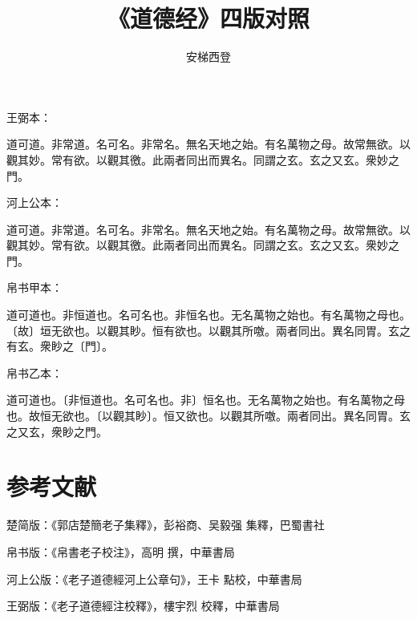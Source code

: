 \documentclass[a5paper]{ctexbook}
\title{《道德经》四版对照}
\author{安梯西登}
\date{}
\begin{document}
    \maketitle

    \tableofcontents

    \chapter{}
    王弼本：

    道可道。非常道。名可名。非常名。無名天地之始。有名萬物之母。故常無欲。以觀其妙。常有欲。以觀其徼。此兩者同出而異名。同謂之玄。玄之又玄。衆妙之門。

    河上公本：

    道可道。非常道。名可名。非常名。無名天地之始。有名萬物之母。故常無欲。以觀其妙。常有欲。以觀其徼。此兩者同出而異名。同謂之玄。玄之又玄。衆妙之門。

    帛书甲本：

    道可道也。非恒道也。名可名也。非恒名也。无名萬物之始也。有名萬物之母也。〔故〕垣无欲也。以觀其眇。恒有欲也。以觀其所噭。兩者同出。異名同胃。玄之有玄。衆眇之〔門〕。

    帛书乙本：

    道可道也。〔非恒道也。名可名也。非〕恒名也。无名萬物之始也。有名萬物之母也。故恒无欲也。〔以觀其眇〕。恒又欲也。以觀其所噭。兩者同出。異名同胃。玄之又玄，衆眇之門。

    \chapter*{参考文献}
    \small
    楚简版：《郭店楚簡老子集釋》，彭裕商、吴毅强 集釋，巴蜀書社

    帛书版：《帛書老子校注》，高明 撰，中華書局

    河上公版：《老子道德經河上公章句》，王卡 點校，中華書局

    王弼版：《老子道德經注校釋》，樓宇烈 校釋，中華書局
\end{document}
